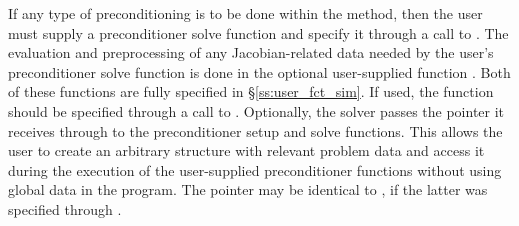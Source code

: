 If any type of preconditioning is to be done within the {\spgmr} method,
then the user must supply a preconditioner solve function 
and specify it through a call to .
The evaluation and preprocessing of any Jacobian-related data needed
by the user's preconditioner solve function is done in the optional
user-supplied function . Both of these functions are
fully specified in \S\ref{ss:user_fct_sim}.
If used, the  function should be specified through a call to
.
Optionally, the {\cvspgmr} solver passes the pointer it receives through 
 to the preconditioner setup and solve functions.  
This allows the user to create an arbitrary structure with relevant problem data 
and access it during the execution of the user-supplied preconditioner functions
without using global data in the program.  
The pointer  may be identical to , if the latter was 
specified through .

